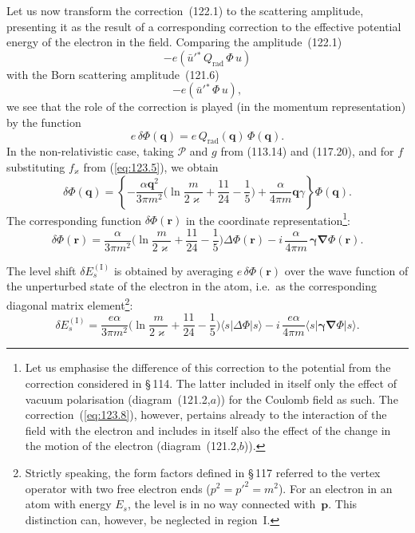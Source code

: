 Let us now transform the correction~(122.1) to the scattering amplitude, presenting it as the result of a corresponding correction to the effective potential energy of the electron in the field. Comparing the amplitude~(122.1)
\[
-e(\bar{u}'\!{}^*\,Q_{\text{rad}}\,\Phi\, u)
\]
with the Born scattering amplitude~(121.6)
\[
-e(\bar{u}'\!{}^*\,\Phi\, u),
\]
we see that the role of the correction is played (in the momentum representation) by the function
\begin{equation}
e\,\delta\Phi(\mathbf{q}) = e\,Q_{\text{rad}}(\mathbf{q})\,\Phi(\mathbf{q}).
\label{eq:123.6}
\end{equation}
In the non-relativistic case, taking $\mathcal{P}$ and $g$ from (113.14) and (117.20), and for $f$ substituting $f_\varkappa$ from (\ref{eq:123.5}), we obtain
\begin{equation}
\delta\Phi(\mathbf{q}) = \left\{-\frac{\alpha\mathbf{q}^2}{3\pi m^2}\biggl(\ln\frac{m}{2\varkappa} + \frac{11}{24} - \frac{1}{5}\biggr) + \frac{\alpha}{4\pi m}\mathbf{q}\gamma\right\}\Phi(\mathbf{q}).
\label{eq:123.7}
\end{equation}
The corresponding function $\delta\Phi(\mathbf{r})$ in the coordinate representation\footnote{Let us emphasise the difference of this correction to the potential from the correction considered in \S\,114. The latter included in itself only the effect of vacuum polarisation (diagram~(121.2,$a$)) for the Coulomb field as such. The correction~(\ref{eq:123.8}), however, pertains already to the interaction of the field with the electron and includes in itself also the effect of the change in the motion of the electron (diagram~(121.2,$b$)).}:
\begin{equation}
\delta\Phi(\mathbf{r}) = \frac{\alpha}{3\pi m^2}\biggl(\ln\frac{m}{2\varkappa} + \frac{11}{24} - \frac{1}{5}\biggr)\Delta\Phi(\mathbf{r}) - i\,\frac{\alpha}{4\pi m}\,\boldsymbol{\gamma}\boldsymbol{\nabla}\Phi(\mathbf{r}).
\label{eq:123.8}
\end{equation}

The level shift $\delta E_s^{(\mathrm{I})}$ is obtained by averaging $e\,\delta\Phi(\mathbf{r})$ over the wave function of the unperturbed state of the electron in the atom, i.e.\ as the corresponding diagonal matrix element\footnote{Strictly speaking, the form factors defined in \S\,117 referred to the vertex operator with two free electron ends ($p^2 = p'^2 = m^2$). For an electron in an atom with energy $E_s$, the level is in no way connected with~$\mathbf{p}$. This distinction can, however, be neglected in region~I.}:
\begin{equation}
\delta E_s^{(\mathrm{I})} = \frac{e\alpha}{3\pi m^2}\biggl(\ln\frac{m}{2\varkappa} + \frac{11}{24} - \frac{1}{5}\biggr)\langle s|\Delta\Phi|s\rangle - i\,\frac{e\alpha}{4\pi m}\langle s|\boldsymbol{\gamma}\boldsymbol{\nabla}\Phi|s\rangle.
\label{eq:123.9}
\end{equation}

